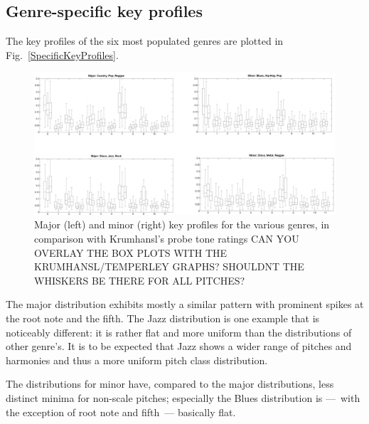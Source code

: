 \documentclass{article}
\begin{document}
\subsection{Genre-specific key profiles}
The key profiles of the six most populated genres are plotted in Fig.~\ref{SpecificKeyProfiles}.
\begin{figure}[tb]
    \includegraphics[scale=.4]{graph/specific_boxplot}
	\caption{Major (left) and minor (right) key profiles for the various genres, in comparison with Krumhansl's probe tone ratings CAN YOU OVERLAY THE BOX PLOTS WITH THE KRUMHANSL/TEMPERLEY GRAPHS? SHOULDNT THE WHISKERS BE THERE FOR ALL PITCHES?}
	\label{fig:SpecificKeyProfiles}
\end{figure}
The major distribution exhibits mostly a similar pattern with prominent spikes at the root note and the fifth. The Jazz distribution is one example that is noticeably different: it is rather flat and more uniform than the distributions of other genre's. It is to be expected that Jazz shows a wider range of pitches and harmonies and thus a more uniform pitch class distribution.

The distributions for minor have, compared to the major distributions, less distinct minima for non-scale pitches; especially the Blues distribution is ---~with the exception of root note and fifth~--- basically flat.
\end{document}
